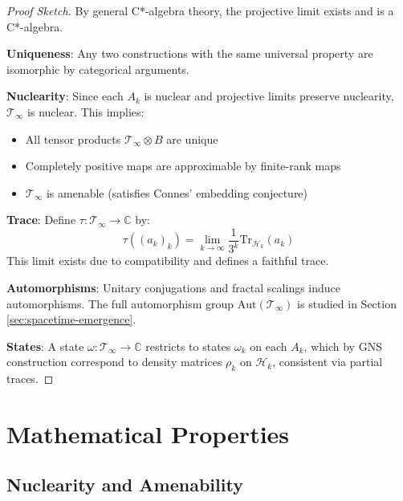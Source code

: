 \begin{defn}
\begin{level3}
\begin{proof}[Proof Sketch]
By general C*-algebra theory\cite{takesaki_theory_2002}, the projective limit exists and is a C*-algebra.

\textbf{Uniqueness}: Any two constructions with the same universal property are isomorphic by categorical arguments.

\textbf{Nuclearity}: Since each $A_k$ is nuclear and projective limits preserve nuclearity, $\mathcal{T}_\infty$ is nuclear. This implies:
\begin{itemize}
\item All tensor products $\mathcal{T}_\infty \otimes B$ are unique
\item Completely positive maps are approximable by finite-rank maps
\item $\mathcal{T}_\infty$ is amenable (satisfies Connes' embedding conjecture)
\end{itemize}

\textbf{Trace}: Define $\tau: \mathcal{T}_\infty \to \mathbb{C}$ by:
\begin{equation}
\tau((a_k)_k) = \lim_{k \to \infty} \frac{1}{3^k}\text{Tr}_{\mathcal{H}_k}(a_k)
\end{equation}
This limit exists due to compatibility and defines a faithful trace.

\textbf{Automorphisms}: Unitary conjugations and fractal scalings induce automorphisms. The full automorphism group $\text{Aut}(\mathcal{T}_\infty)$ is studied in Section \ref{sec:spacetime-emergence}.

\textbf{States}: A state $\omega: \mathcal{T}_\infty \to \mathbb{C}$ restricts to states $\omega_k$ on each $A_k$, which by GNS construction correspond to density matrices $\rho_k$ on $\mathcal{H}_k$, consistent via partial traces.
\end{proof}
\end{level3}

\section{Mathematical Properties}
\label{sec:math-properties}

\subsection{Nuclearity and Amenability}


\end{defn}
